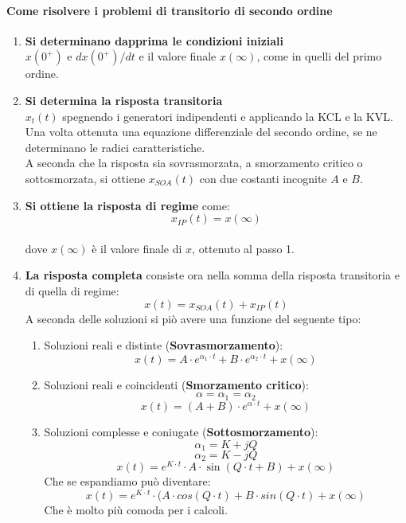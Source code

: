 \documentclass[../main.tex]{subfiles}
\begin{document}
	\paragraph{{\color{red} Come risolvere i problemi di transitorio di secondo ordine}}
	\begin{enumerate}
		\item \textbf{Si determinano dapprima le condizioni iniziali} \\
			$x(0^+)$ e $dx(0^+)/dt$ e il valore finale $x(\infty)$, come in quelli del primo ordine.
		
		\item \textbf{Si determina la risposta transitoria}\\
			$x_t(t)$ spegnendo i generatori indipendenti e applicando la KCL e la KVL. \\
			Una volta ottenuta una equazione differenziale del secondo ordine, se ne determinano le radici caratteristiche. \\
			A seconda che la risposta sia sovrasmorzata, a smorzamento critico o sottosmorzata, si ottiene $x_{SOA}(t)$ con due costanti incognite $A$ e $B$.
		
		\item \textbf{Si ottiene la risposta di regime} come:
			$$x_{IP}(t) = x(\infty)$$ \\
			dove $x(\infty)$ è il valore finale di $x$, ottenuto al passo 1.
		
		\item \textbf{La risposta completa}
			consiste ora nella somma della risposta transitoria e di quella di regime:
			$$x(t) = x_{SOA}(t) + x_{IP}(t) $$
			A seconda delle soluzioni si piò avere una funzione del seguente tipo: 
			\begin{enumerate}
				\item Soluzioni reali e distinte (\textbf{Sovrasmorzamento}):\\
				$$ \boxed{x(t) = A \cdot e^{\alpha_1 \cdot t} + B \cdot e^{\alpha_2 \cdot t}+x(\infty)}$$
				\item Soluzioni reali e coincidenti (\textbf{Smorzamento critico}):
				$$\alpha = \alpha_1 = \alpha_2$$
				$$ \boxed{x(t) = (A + B) \cdot e^{\alpha \cdot t}+x(\infty)}$$
				\item Soluzioni complesse e coniugate (\textbf{Sottosmorzamento}):
				$$\alpha_1 = K + jQ$$
				$$\alpha_2 = K - jQ$$
				$$x(t) = e^{K \cdot t} \cdot A \cdot \sin (Q \cdot t + B) + x(\infty)$$
				Che se espandiamo può diventare:
				$$\boxed{ x(t)=e^{K \cdot t} \cdot (A \cdot cos(Q \cdot t ) + B \cdot sin(Q \cdot t) + x(\infty)}$$
				Che è molto più comoda per i calcoli.
			\end{enumerate}
		

\end{enumerate}
\end{document}
